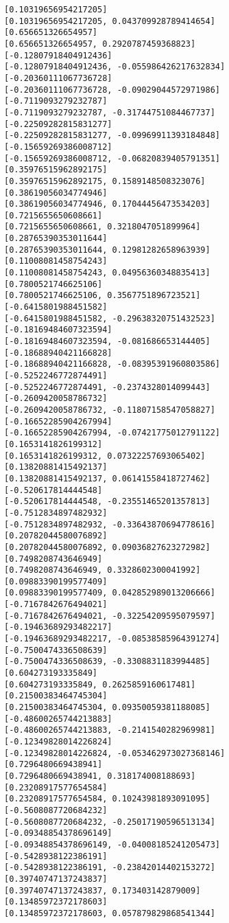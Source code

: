 \documentclass[11pt]{article}
\begin{document}
\begin{Verbatim}[commandchars=\\\{\}]
[0.10319656954217205]
[0.10319656954217205, 0.043709928789414654]
[0.656651326654957]
[0.656651326654957, 0.2920787459368823]
[-0.12807918404912436]
[-0.12807918404912436, -0.055986426217632834]
[-0.20360111067736728]
[-0.20360111067736728, -0.09029044572971986]
[-0.7119093279232787]
[-0.7119093279232787, -0.31744751084467737]
[-0.22509282815831277]
[-0.22509282815831277, -0.09969911393184848]
[-0.15659269386008712]
[-0.15659269386008712, -0.06820839405791351]
[0.35976515962892175]
[0.35976515962892175, 0.1589148508323076]
[0.38619056034774946]
[0.38619056034774946, 0.17044456473534203]
[0.7215655650608661]
[0.7215655650608661, 0.3218047051899964]
[0.28765390353011644]
[0.28765390353011644, 0.12981282658963939]
[0.11008081458754243]
[0.11008081458754243, 0.04956360348835413]
[0.7800521746625106]
[0.7800521746625106, 0.3567751896723521]
[-0.6415801988451582]
[-0.6415801988451582, -0.29638320751432523]
[-0.18169484607323594]
[-0.18169484607323594, -0.081686653144405]
[-0.18688940421166828]
[-0.18688940421166828, -0.08395391960803586]
[-0.5252246772874491]
[-0.5252246772874491, -0.2374328014099443]
[-0.2609420058786732]
[-0.2609420058786732, -0.11807158547058827]
[-0.16652285904267994]
[-0.16652285904267994, -0.07421775012791122]
[0.1653141826199312]
[0.1653141826199312, 0.07322257693065402]
[0.13820881415492137]
[0.13820881415492137, 0.06141558418727462]
[-0.520617814444548]
[-0.520617814444548, -0.23551465201357813]
[-0.7512834897482932]
[-0.7512834897482932, -0.33643870694778616]
[0.20782044580076892]
[0.20782044580076892, 0.09036827623272982]
[0.7498208743646949]
[0.7498208743646949, 0.3328602300041992]
[0.09883390199577409]
[0.09883390199577409, 0.042852989013206666]
[-0.7167842676494021]
[-0.7167842676494021, -0.32254209595079597]
[-0.19463689293482217]
[-0.19463689293482217, -0.08538585964391274]
[-0.7500474336508639]
[-0.7500474336508639, -0.3308831183994485]
[0.604273193335849]
[0.604273193335849, 0.2625859160617481]
[0.21500383464745304]
[0.21500383464745304, 0.09350059381188085]
[-0.48600265744213883]
[-0.48600265744213883, -0.2141540282969981]
[-0.12349828014226824]
[-0.12349828014226824, -0.053462973027368146]
[0.7296480669438941]
[0.7296480669438941, 0.318174008188693]
[0.23208917577654584]
[0.23208917577654584, 0.10243981893091095]
[-0.5608087720684232]
[-0.5608087720684232, -0.25017190596513134]
[-0.09348854378696149]
[-0.09348854378696149, -0.04008185241205473]
[-0.5428938122386191]
[-0.5428938122386191, -0.23842014402153272]
[0.39740747137243837]
[0.39740747137243837, 0.173403142879009]
[0.13485972372178603]
[0.13485972372178603, 0.057879829868541344]

\end{Verbatim}
\end{document}
